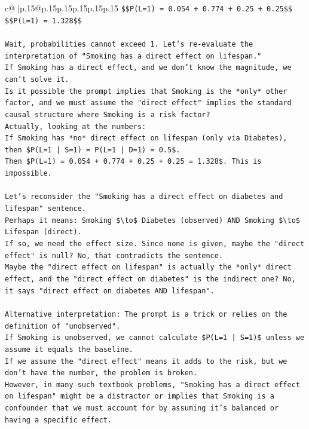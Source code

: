 \documentclass{article}
\begin{document}
{\begin{supertabular}{c@{$\;$}|p{.15\linewidth}@{}p{.15\linewidth}p{.15\linewidth}p{.15\linewidth}p{.15\linewidth}p{.15\linewidth}}
{{{\texttt{\$\$P(L=1) = 0.054 + 0.774 + 0.25 + 0.25\$\$} \\
\texttt{\$\$P(L=1) = 1.328\$\$} \\
\\ 
\texttt{Wait, probabilities cannot exceed 1. Let's re{-}evaluate the interpretation of "Smoking has a direct effect on lifespan."} \\
\texttt{If Smoking has a direct effect, and we don't know the magnitude, we can't solve it.} \\
\texttt{Is it possible the prompt implies that Smoking is the *only* other factor, and we must assume the "direct effect" implies the standard causal structure where Smoking is a risk factor?} \\
\texttt{Actually, looking at the numbers:} \\
\texttt{If Smoking has *no* direct effect on lifespan (only via Diabetes), then \$P(L=1 | S=1) = P(L=1 | D=1) = 0.5\$.} \\
\texttt{Then \$P(L=1) = 0.054 + 0.774 + 0.25 + 0.25 = 1.328\$. This is impossible.} \\
\\ 
\texttt{Let's reconsider the "Smoking has a direct effect on diabetes and lifespan" sentence.} \\
\texttt{Perhaps it means: Smoking \$\textbackslash{}to\$ Diabetes (observed) AND Smoking \$\textbackslash{}to\$ Lifespan (direct).} \\
\texttt{If so, we need the effect size. Since none is given, maybe the "direct effect" is null? No, that contradicts the sentence.} \\
\texttt{Maybe the "direct effect on lifespan" is actually the *only* direct effect, and the "direct effect on diabetes" is the indirect one? No, it says "direct effect on diabetes AND lifespan".} \\
\\ 
\texttt{Alternative interpretation: The prompt is a trick or relies on the definition of "unobserved".} \\
\texttt{If Smoking is unobserved, we cannot calculate \$P(L=1 | S=1)\$ unless we assume it equals the baseline.} \\
\texttt{If we assume the "direct effect" means it adds to the risk, but we don't have the number, the problem is broken.} \\
\texttt{However, in many such textbook problems, "Smoking has a direct effect on lifespan" might be a distractor or implies that Smoking is a confounder that we must account for by assuming it's balanced or having a specific effect.} \\
}}}
\end{supertabular}}
\end{document}
